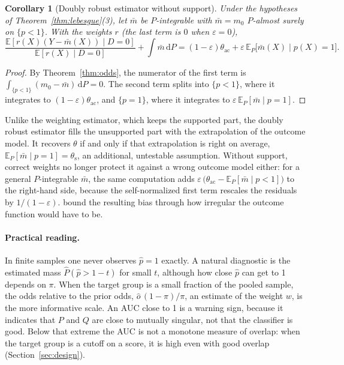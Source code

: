 \documentclass[11pt,a4paper]{article}
\newcommand{\E}{\mathbb{E}}
\newcommand{\dd}{\,\mathrm{d}}
\newcommand{\thac}{\theta_{\mathrm{ac}}}
\newcommand{\ths}{\theta_{\mathrm{s}}}
\theoremstyle{plain}
\newtheorem{corollary}{Corollary}
\theoremstyle{definition}
\begin{document}
\begin{corollary}[Doubly robust estimator without support]\label{cor:drnosupport}
Under the hypotheses of Theorem~\ref{thm:lebesgue}(3), let $\bar m$ be $P$-integrable with $\bar m=m_0$ $P$-almost surely on $\{p<1\}$. With the weights $r$ (the last term is $0$ when $\varepsilon=0$),
\[
\frac{\E[r(X)(Y-\bar m(X))\mid D=0]}{\E[r(X)\mid D=0]}+\int\bar m\dd P=(1-\varepsilon)\thac+\varepsilon\,\E_P\bigl[\bar m(X)\mid p(X)=1\bigr].
\]
\end{corollary}
\begin{proof}
By Theorem~\ref{thm:odds}, the numerator of the first term is $\int_{\{p<1\}}(m_0-\bar m)\dd P=0$. The second term splits into $\{p<1\}$, where it integrates to $(1-\varepsilon)\thac$, and $\{p=1\}$, where it integrates to $\varepsilon\,\E_P[\bar m\mid p=1]$.
\end{proof}

Unlike the weighting estimator, which keeps the supported part, the doubly robust estimator fills the unsupported part with the extrapolation of the outcome model. It recovers $\theta$ if and only if that extrapolation is right on average, $\E_P[\bar m\mid p=1]=\ths$, an additional, untestable assumption. Without support, correct weights no longer protect it against a wrong outcome model either: for a general $P$-integrable $\bar m$, the same computation adds $\varepsilon\,\bigl(\thac-\E_P[\bar m\mid p<1]\bigr)$ to the right-hand side, because the self-normalized first term rescales the residuals by $1/(1-\varepsilon)$. \citet{manamkoong2025} bound the resulting bias through how irregular the outcome function would have to be.

\paragraph{Practical reading.} In finite samples one never observes $\hat p=1$ exactly. A natural diagnostic is the estimated mass $\hat P(\hat p>1-t)$ for small $t$, although how close $\hat p$ can get to 1 depends on $\pi$. When the target group is a small fraction of the pooled sample, the odds relative to the prior odds, $\hat o\,(1-\pi)/\pi$, an estimate of the weight $w$, is the more informative scale. An AUC close to 1 is a warning sign, because it indicates that $P$ and $Q$ are close to mutually singular, not that the classifier is good. Below that extreme the AUC is not a monotone measure of overlap: when the target group is a cutoff on a score, it is high even with good overlap (Section~\ref{sec:design}).
\end{document}
